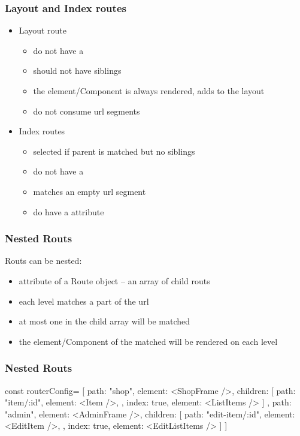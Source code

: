 \begin{frame}[fragile] \frametitle{Layout and Index routes}
\begin{itemize}
  \item Layout route
  \begin{itemize}
    \item do not have a 
    \item should not have siblings
    \item the element/Component is always rendered, adds to the layout
    \item do not consume url segments
  \end{itemize}
  \item Index routes
  \begin{itemize}
    \item selected if parent is matched but no siblings
    \item do not have a 
    \item matches an empty url segment
    \item do have a  attribute
  \end{itemize}
\end{itemize}
\end{frame}

\begin{frame}[fragile] \frametitle{Nested Routs}
Routs can be nested:
\begin{itemize}
  \item {} attribute of a Route object -- an array of child routs
  \item each level matches a part of the url
  \item at most one  in the child array will be matched
  \item the element/Component of the matched  will be rendered on each level
\end{itemize}
\end{frame}


\begin{frame}[fragile] \frametitle{Nested Routs}
\begin{CodeBox}{}
const routerConfig= [{
        path: "shop",
        element: <ShopFrame />,
        children: [
          {
            path: "item/:id",
            element: <Item />,
          }, {
            index: true,
            element: <ListItems />
          }]
      }, {
        path: "admin",
        element: <AdminFrame />,
        children: [
          {
            path: "edit-item/:id",
            element: <EditItem />,
          }, {
            index: true,
            element: <EditListItems />
          }]
      }]
\end{CodeBox}
\end{frame}

